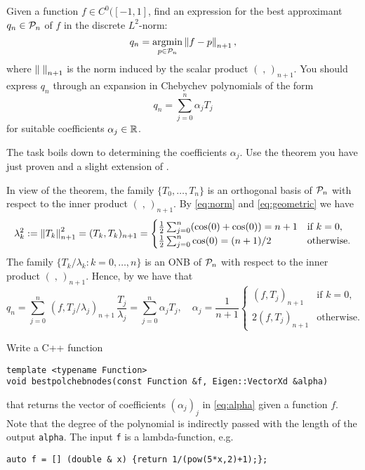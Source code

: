 \begin{problem}
\begin{subproblem}[2] 
  Given a function $f\in C^0([-1,1]$, find an expression for the best approximant
  $q_n\in{\cal P}_{n}$ of $f$ in the discrete $L^{2}$-norm:
\[
q_n=\operatorname*{argmin}_{p\in{\cal P}_{n}} \left\lVert f-p \right\rVert_{n+1},
\]
where $\left\lVert \; \right\rVert_{n+1}$ is the norm induced by the scalar product
$(\;,\,)_{n+1}$. You should express $q_n$ through an expansion in Chebychev
polynomials of the form
\begin{equation}\label{eq:alpha}
q_n=\sum_{j=0}^n \alpha_j T_j
\end{equation}
for suitable coefficients $\alpha_j\in\mathbb{R}$.
\begin{hint}
The task boils down to determining the coefficients $\alpha_{j}$. 
Use the theorem you have just proven and a slight extension of .
\end{hint}
\begin{solution}
In view of the theorem, the family $\{T_0,\dots,T_n\}$ is an orthogonal basis of ${\cal P}_{n}$ with respect to the inner product $(\; ,\,)_{n+1}$. By \eqref{eq:norm} and \eqref{eq:geometric} we have
\begin{equation}\label{eq:lambda}
\lambda_k^2:=\left\lVert T_k \right\rVert^2_{n+1}=(T_k,T_k)_{n+1}=
\begin{cases}
\frac{1}{2}\sum_{j=0}^n(\cos(0) + \cos(0))=n+1 & \text{if $k=0$},\\
\frac{1}{2}\sum_{j=0}^n \cos(0)=(n+1)/2 & \text{otherwise.}
\end{cases}
\end{equation}
The family $\{T_k/\lambda_k:k=0,\dots,n\}$ is an ONB of ${\cal P}_{n}$ with respect to the inner product $(\; ,\,)_{n+1}$. Hence, by  we have that
\[
q_n=\sum_{j=0}^n\, (f,T_j/\lambda_j)_{n+1}\, \frac{T_j}{\lambda_j}=\sum_{j=0}^n \alpha_j T_j,\quad \alpha_j=\frac{1}{n+1}
\begin{cases}
{(f,T_j)_{n+1}} & \text{if $k=0$},\\
2 {(f,T_j)_{n+1}}& \text{otherwise.}
\end{cases}
\]
\end{solution}
\end{subproblem}

\begin{subproblem}[2]
Write a C++ function
\begin{lstlisting}
template <typename Function>
void bestpolchebnodes(const Function &f, Eigen::VectorXd &alpha)
\end{lstlisting}
that returns the vector of coefficients $(\alpha_j)_j$ in \eqref{eq:alpha} given a function $f$. Note that the degree of the polynomial is indirectly passed with the length of the output \texttt{alpha}. The input \texttt{f} is a lambda-function, e.g.
\begin{lstlisting}
auto f = [] (double & x) {return 1/(pow(5*x,2)+1);};
\end{lstlisting}



\end{subproblem}
\end{problem}
